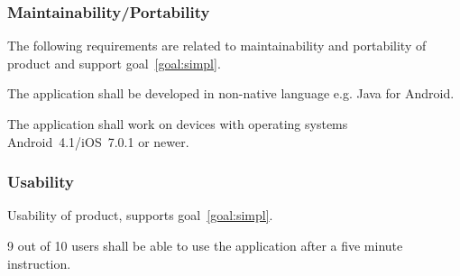 \documentclass[10pt,a4paper]{article}
\begin{document}
\subsubsection{Maintainability/Portability}
The following requirements are related to maintainability and portability of product and support goal~\ref{goal:simpl}.

\begin{description}
	\item [Req \thesubsubsection {.\themapo} Language] The application shall be developed in non-native language e.g. Java for Android. 
	\item [Req \thesubsubsection {.\themapo} Device support] The application shall work on devices with operating systems Android~4.1/iOS~7.0.1 or newer.
\end{description}

\subsubsection{Usability}
Usability of product, supports goal~\ref{goal:simpl}.
\begin{description}
	\item [Req \thesubsubsection {.\theusab} User friendly] 9 out of 10 users shall be able to use the application after a five minute instruction.
\end{description}






\end{document}
